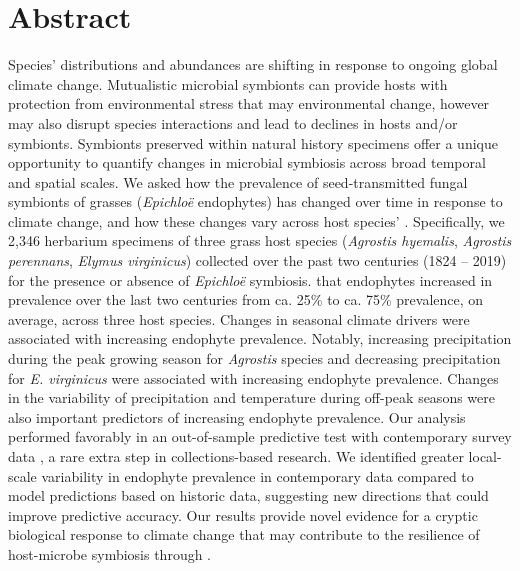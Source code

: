 \documentclass[11pt]{article}
\newcommand{\revise}[1]{{\color{black}{#1}}}
\begin{document}
	\section*{Abstract}
Species' distributions and abundances are shifting in response to ongoing global climate change. 
Mutualistic microbial symbionts can provide hosts with protection from environmental stress that may \revise{promote resilience under} environmental change, however \revise{this change} may also disrupt species interactions and lead to declines in hosts and/or symbionts.
Symbionts preserved within natural history specimens offer a unique opportunity to quantify changes in microbial symbiosis across broad temporal and spatial scales. 
We asked how the prevalence of seed-transmitted fungal symbionts of grasses (\emph{Epichloë} endophytes) has changed over time in response to climate change, and how these changes vary across host species' \revise{distributions}.
Specifically, we \revise{examined} 2,346 herbarium specimens of three grass host species (\emph{Agrostis hyemalis}, \emph{Agrostis perennans}, \emph{Elymus virginicus}) collected over the past two centuries (1824 -- 2019) for the presence or absence of \emph{Epichloë} symbiosis.
\revise{Analysis of an approximate Bayesian spatially-varying coefficients model revealed} that endophytes increased in prevalence over the last two centuries from ca. 25\% to ca. 75\% prevalence, on average, across three host species.
Changes in seasonal climate drivers were associated with increasing endophyte prevalence. 
Notably, increasing precipitation during the peak growing season for \emph{Agrostis} species and decreasing precipitation for \emph{E. virginicus} were associated with increasing endophyte prevalence.
Changes in the variability of precipitation and temperature during off-peak seasons were also important predictors of increasing endophyte prevalence. 
Our analysis performed favorably in an out-of-sample predictive test with contemporary survey data \revise{from across 63 populations}, a rare extra step in collections-based research.
We identified greater local-scale variability in endophyte prevalence in contemporary data compared to model predictions based on historic data, suggesting new directions that could improve predictive accuracy.
Our results provide novel evidence for a cryptic biological response to climate change that may contribute to the resilience of host-microbe symbiosis through \revise{fitness benefits to symbiotic hosts}. 
\end{document}
